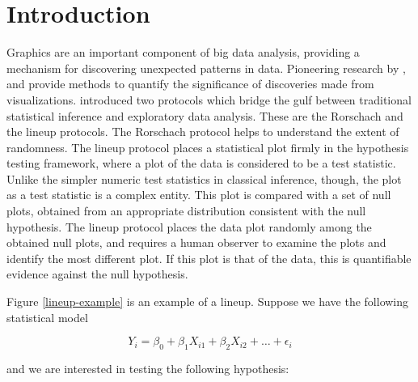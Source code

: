 \documentclass[12]{article}
\begin{document}
\tableofcontent
\newpage

\section{Introduction} 
Graphics are an important component of big data analysis, providing a mechanism for discovering unexpected patterns in data. Pioneering research by \citet{gelman:2004}, \citet{buja:2009} and \cite{majumder:2011} provide methods to quantify the significance of discoveries made from visualizations. %
\cite{buja:2009} introduced two protocols which bridge the gulf between traditional statistical inference and exploratory data analysis. These are the Rorschach and the lineup protocols. The Rorschach protocol helps to understand the extent of randomness. The lineup protocol places a statistical plot firmly in the hypothesis testing framework, where a plot of the data is considered to be a test statistic. Unlike the simpler numeric test statistics in classical inference, though, the plot as a test statistic is a complex entity. This plot is compared with a set of null plots, obtained from an appropriate distribution consistent with the null hypothesis. The lineup protocol places the data plot randomly among the obtained null plots, and requires a human observer to examine the plots and identify the most different plot. If this plot is that of the data, this is quantifiable evidence against the null hypothesis. 

Figure \ref{lineup-example} is an example of a lineup. Suppose we have the following statistical model

$$Y_i = \beta_0 + \beta_1 X_{i1} + \beta_2 X_{i2} + \dots + \epsilon_i$$

\noindent and we are interested in testing the following hypothesis:
\end{document}
